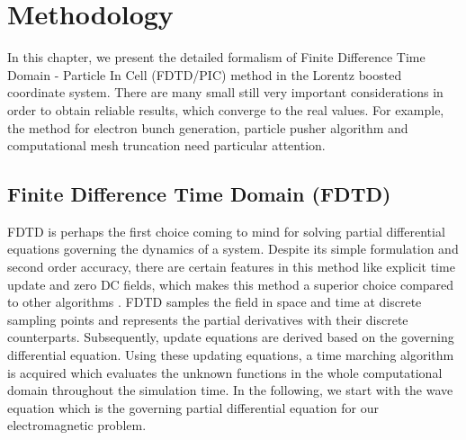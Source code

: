 \chapter{Methodology}
\label{chapter_methodology}

In this chapter, we present the detailed formalism of Finite Difference Time Domain - Particle In Cell (FDTD/PIC) method in the Lorentz boosted coordinate system.
%
There are many small still very important considerations in order to obtain reliable results, which converge to the real values.
%
For example, the method for electron bunch generation, particle pusher algorithm and computational mesh truncation need particular attention.

\section{Finite Difference Time Domain (FDTD)}
\label{section FDTD}

FDTD is perhaps the first choice coming to mind for solving partial differential equations governing the dynamics of a system.
%
Despite its simple formulation and second order accuracy, there are certain features in this method like explicit time update and zero DC fields, which makes this method a superior choice compared to other algorithms \cite{taflove2000computational}.
%
FDTD samples the field in space and time at discrete sampling points and represents the partial derivatives with their discrete counterparts.
%
Subsequently, update equations are derived based on the governing differential equation.
%
Using these updating equations, a time marching algorithm is acquired which evaluates the unknown functions in the whole computational domain throughout the simulation time.
%
In the following, we start with the wave equation which is the governing partial differential equation for our electromagnetic problem.

